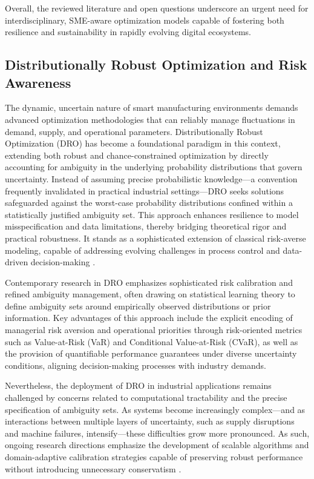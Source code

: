 \documentclass[sigconf]{acmart}
\begin{document}
Overall, the reviewed literature and open questions underscore an urgent need for interdisciplinary, SME-aware optimization models capable of fostering both resilience and sustainability in rapidly evolving digital ecosystems.

\subsection{Distributionally Robust Optimization and Risk Awareness}

The dynamic, uncertain nature of smart manufacturing environments demands advanced optimization methodologies that can reliably manage fluctuations in demand, supply, and operational parameters. Distributionally Robust Optimization (DRO) has become a foundational paradigm in this context, extending both robust and chance-constrained optimization by directly accounting for ambiguity in the underlying probability distributions that govern uncertainty. Instead of assuming precise probabilistic knowledge—a convention frequently invalidated in practical industrial settings—DRO seeks solutions safeguarded against the worst-case probability distributions confined within a statistically justified ambiguity set. This approach enhances resilience to model misspecification and data limitations, thereby bridging theoretical rigor and practical robustness. It stands as a sophisticated extension of classical risk-averse modeling, capable of addressing evolving challenges in process control and data-driven decision-making \cite{ref77}.

Contemporary research in DRO emphasizes sophisticated risk calibration and refined ambiguity management, often drawing on statistical learning theory to define ambiguity sets around empirically observed distributions or prior information. Key advantages of this approach include the explicit encoding of managerial risk aversion and operational priorities through risk-oriented metrics such as Value-at-Risk (VaR) and Conditional Value-at-Risk (CVaR), as well as the provision of quantifiable performance guarantees under diverse uncertainty conditions, aligning decision-making processes with industry demands.

Nevertheless, the deployment of DRO in industrial applications remains challenged by concerns related to computational tractability and the precise specification of ambiguity sets. As systems become increasingly complex—and as interactions between multiple layers of uncertainty, such as supply disruptions and machine failures, intensify—these difficulties grow more pronounced. As such, ongoing research directions emphasize the development of scalable algorithms and domain-adaptive calibration strategies capable of preserving robust performance without introducing unnecessary conservatism \cite{ref77}.
\end{document}
